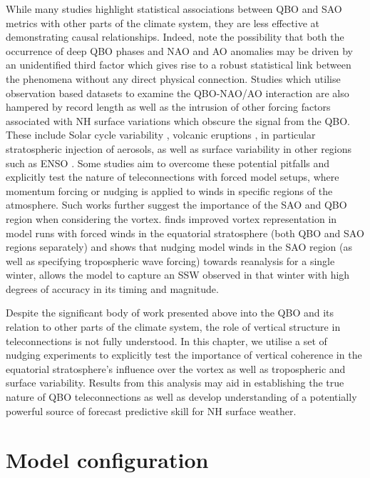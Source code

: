 While many studies highlight statistical associations between QBO and SAO metrics with other parts of the climate system, they are less effective at demonstrating causal relationships. Indeed, \cite{andrewsObserved2019d} note the possibility that both the occurrence of deep QBO phases and NAO and AO anomalies may be driven by an unidentified third factor which gives rise to a robust statistical link between the phenomena without any direct physical connection. Studies which utilise observation based datasets to examine the QBO-NAO/AO interaction are also hampered by record length as well as the intrusion of other forcing factors associated with NH surface variations which obscure the signal from the QBO. These include Solar cycle variability \citep{GrayElevenyear2016}, volcanic eruptions \citep{stenchikovArctic2004}, in particular stratospheric injection of aerosols, as well as surface variability in other regions such as ENSO \citep{bellStratospheric2009}. Some studies aim to overcome these potential pitfalls and explicitly test the nature of teleconnections with forced model setups, where momentum forcing or nudging is applied to winds in specific regions of the atmosphere. Such works further suggest the importance of the SAO and QBO region when considering the vortex. \cite{pascoeQuasibiennial2005b} finds improved vortex representation in model runs with forced winds in the equatorial stratosphere (both QBO and SAO regions separately) and \cite{grayForecasting2020a} shows that nudging model winds in the SAO region (as well as specifying tropospheric wave forcing) towards reanalysis for a single winter, allows the model to capture an SSW observed in that winter with high degrees of accuracy in its timing and magnitude.   

Despite the significant body of work presented above into the QBO and its relation to other parts of the climate system, the role of vertical structure in teleconnections is not fully understood. In this chapter, we utilise a set of nudging experiments to explicitly test the importance of vertical coherence in the equatorial stratosphere's influence over the vortex as well as tropospheric and surface variability. Results from this analysis may aid in establishing the true nature of QBO teleconnections as well as develop understanding of a potentially powerful source of forecast predictive skill for NH surface weather.

\section{Model configuration}

